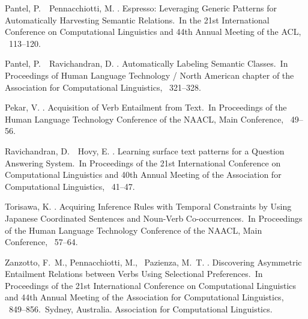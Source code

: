\documentclass[japanese]{jnlp_1.4}
\begin{document}
\begin{thebibliography}{}
Pantel, P.\BBACOMMA\ \BBA\ Pennacchiotti, M. \BBCP.
\newblock \BBOQ Espresso: Leveraging Generic Patterns for Automatically
  Harvesting Semantic Relations.\BBCQ\
\newblock In {\Bem the 21st International Conference on Computational
  Linguistics and 44th Annual Meeting of the ACL}, \mbox{\BPGS\ 113--120}.

Pantel, P.\BBACOMMA\ \BBA\ Ravichandran, D. \BBCP.
\newblock \BBOQ Automatically Labeling Semantic Classes.\BBCQ\
\newblock In {\Bem Proceedings of Human Language Technology / North American
  chapter of the Association for Computational Linguistics}, \mbox{\BPGS\
  321--328}.

Pekar, V. \BBOP 2006\BBCP.
\newblock \BBOQ Acquisition of Verb Entailment from Text.\BBCQ\
\newblock In {\Bem Proceedings of the Human Language Technology Conference of
  the NAACL, Main Conference}, \mbox{\BPGS\ 49--56}.

Ravichandran, D.\BBACOMMA\ \BBA\ Hovy, E. \BBCP.
\newblock \BBOQ Learning surface text patterns for a Question Answering
  System.\BBCQ\
\newblock In {\Bem Proceedings of the 21st International Conference on
  Computational Linguistics and 40th Annual Meeting of the Association for
  Computational Linguistics}, \mbox{\BPGS\ 41--47}.

Torisawa, K. \BBOP 2006\BBCP.
\newblock \BBOQ Acquiring Inference Rules with Temporal Constraints by Using
  Japanese Coordinated Sentences and Noun-Verb Co-occurrences.\BBCQ\
\newblock In {\Bem Proceedings of the Human Language Technology Conference of
  the NAACL, Main Conference}, \mbox{\BPGS\ 57--64}.

Zanzotto, F.~M., Pennacchiotti, M., \BBA\ Pazienza, M.~T. \BBCP.
\newblock \BBOQ Discovering Asymmetric Entailment Relations between Verbs Using
  Selectional Preferences.\BBCQ\
\newblock In {\Bem Proceedings of the 21st International Conference on
  Computational Linguistics and 44th Annual Meeting of the Association for
  Computational Linguistics}, \mbox{\BPGS\ 849--856.}\ Sydney, Australia.
  Association for Computational Linguistics.

\end{thebibliography}
\end{document}
